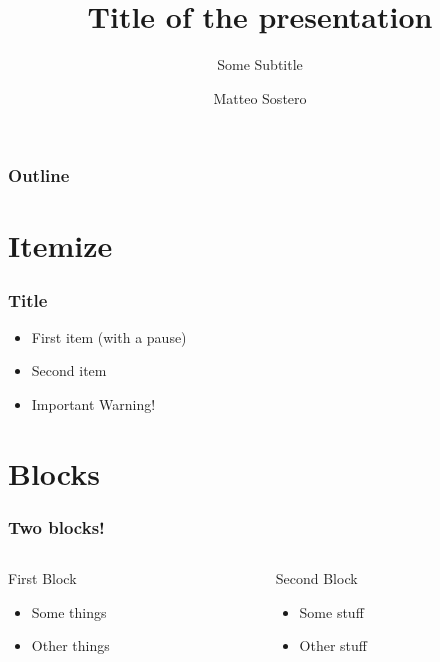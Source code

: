 \documentclass{beamer} 						%
\title{Title of the presentation}
\subtitle{Some Subtitle}
\author{Matteo Sostero}
\institute{Universit\`{a} Ca' Foscari}
\begin{document}
\maketitle

\begin{frame}
\frametitle{Outline}
\tableofcontents[pausesections]
\end{frame}

\section{Itemize}
\begin{frame}
    \frametitle{Title}
    \begin{itemize}
	\item First item (with a pause)
	\pause	
	\item Second item
	\pause 
	\item \alert{Important Warning!}
	
	\end{itemize}
\end{frame}

\section{Blocks}
\begin{frame}
    \frametitle{Two blocks!} 
    \begin{columns}
	\begin{column}{5cm}
	    \begin{block}{First Block}
		\begin{itemize}
		    \item Some things
		    \item Other things
		\end{itemize}
		\end{block}
		\end{column}
\pause		
	\begin{column}{5cm}
	    \begin{block}{Second Block}
		\begin{itemize}
		    \item Some stuff
		    \item Other stuff
		\end{itemize}
		\end{block}
		\end{column}
	\end{columns}

\end{frame}
\end{document}
